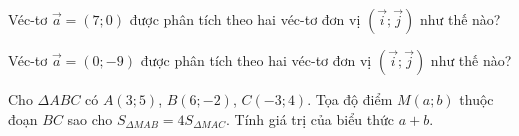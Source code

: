 \begin{bt}%
	Véc-tơ $\overrightarrow{a}=(7;0)$ được phân tích theo hai véc-tơ đơn vị $\left(\overrightarrow{i};\overrightarrow{j}\right)$ như thế nào?
\end{bt}

\begin{bt}%
	Véc-tơ $\overrightarrow{a}=(0;-9)$ được phân tích theo hai véc-tơ đơn vị $\left(\overrightarrow{i};\overrightarrow{j}\right)$ như thế nào?
\end{bt}

\begin{bt}%
	Cho $\Delta ABC$ có $A(3; 5)$, $B(6;-2)$, $C(-3; 4)$. Tọa độ điểm $M(a;b)$ thuộc đoạn $BC$ sao cho $S_{\Delta MAB}=4 S_{\Delta MAC}$. Tính giá trị của biểu thức $a+b$.
\end{bt}

